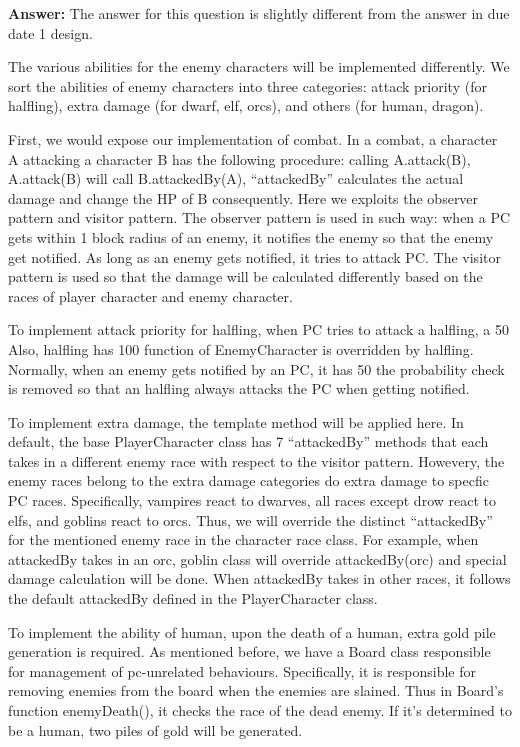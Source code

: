\documentclass[11pt]{article}
\theoremstyle{plain} \newtheorem{theorem*}{Theorem}[subsection]
\begin{document}
\textbf{Answer:}
The answer for this question is slightly different from the answer in due date
1 design. 

The various abilities for the enemy characters will be implemented differently.
We sort the abilities of enemy characters into three categories: attack
priority (for halfling), extra damage (for dwarf, elf, orcs), and others (for
human, dragon).  

First, we would expose our implementation of combat. In a combat, a character A
attacking a character B has the following procedure: calling A.attack(B),
A.attack(B) will call B.attackedBy(A), “attackedBy” calculates the actual
damage and change the HP of B consequently. Here we exploits the observer
pattern and visitor pattern. The observer pattern is used in such way: when a
PC gets within 1 block radius of an enemy, it notifies the enemy so that the
enemy get notified. As long as an enemy gets notified, it tries to attack PC.
The visitor pattern is used so that the damage will be calculated differently
based on the races of player character and enemy character. 

To implement attack priority for halfling, when PC tries to attack a halfling,
a 50%
Also, halfling has 100%
function of EnemyCharacter is overridden by halfling. Normally, when an enemy
gets notified by an PC, it has 50%
the probability check is removed so that an halfling always attacks the PC when
getting notified. 

To implement extra damage, the template method will be applied here. In
default, the base PlayerCharacter class has 7 “attackedBy” methods that each
takes in a different enemy race with respect to the visitor pattern. Howevery,
the enemy races belong to the extra damage categories do extra damage to
specfic PC races. Specifically, vampires react to dwarves, all races except
drow react to elfs, and goblins react to orcs. Thus, we will override the
distinct “attackedBy” for the mentioned enemy race in the character race class.
For example,  when attackedBy takes in an orc, goblin class will override
attackedBy(orc) and special damage calculation will be done. When attackedBy
takes in other races, it follows the default attackedBy defined in the
PlayerCharacter class. 

To implement the ability of human, upon the death of a human, extra gold pile
generation is required. As mentioned before, we have a Board class responsible
for management of pc-unrelated behaviours. Specifically, it is responsible for
removing enemies from the board when the enemies are slained. Thus in Board’s
function enemyDeath(), it checks the race of the dead enemy. If it’s determined
to be a human, two piles of gold will be generated. 
\end{document}
